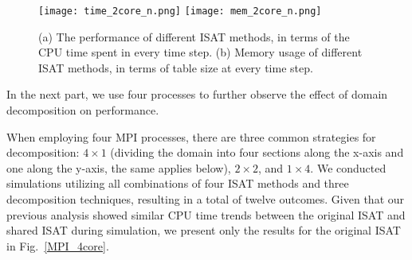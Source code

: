 

\begin{figure}[htbp]
	\centering
	\texttt{[image: time\_2core\_n.png]}
	\texttt{[image: mem\_2core\_n.png]}
	\caption{(a) The performance of different ISAT methods, in terms of the CPU time spent in every time step. (b) Memory usage of different ISAT methods, in terms of table size at every time step.}\label{MPI_2core}
\end{figure}

In the next part, we use four processes to further observe the effect of domain decomposition on performance.


When employing four MPI processes, there are three common strategies for decomposition: $4\times1$ (dividing the domain into four sections along the x-axis and one along the y-axis, the same applies below), $2\times2$, and $1\times4$. We conducted simulations utilizing all combinations of four ISAT methods and three decomposition techniques, resulting in a total of twelve outcomes. Given that our previous analysis showed similar CPU time trends between the original ISAT and shared ISAT during simulation, we present only the results for the original ISAT in Fig.~\ref{MPI_4core}.


